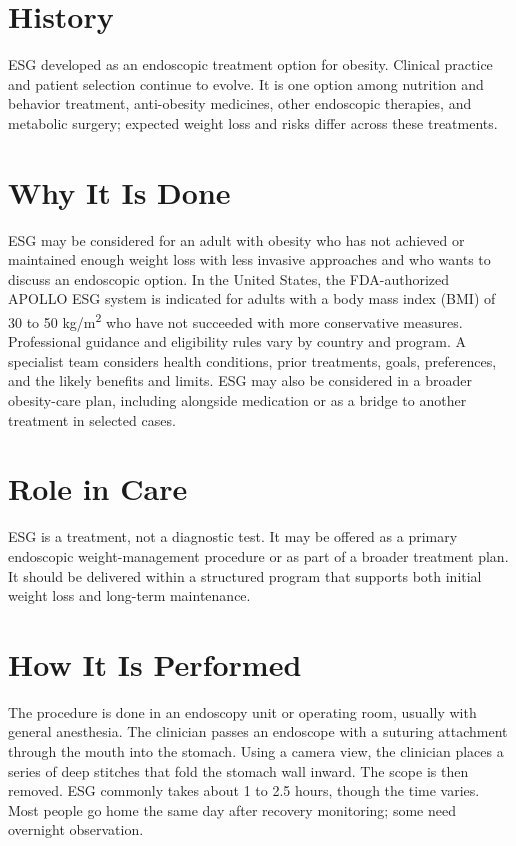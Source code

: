 \section*{History}
ESG developed as an endoscopic treatment option for obesity. Clinical practice and patient selection continue to evolve. It is one option among nutrition and behavior treatment, anti-obesity medicines, other endoscopic therapies, and metabolic surgery; expected weight loss and risks differ across these treatments.

\section*{Why It Is Done}
ESG may be considered for an adult with obesity who has not achieved or maintained enough weight loss with less invasive approaches and who wants to discuss an endoscopic option. In the United States, the FDA-authorized APOLLO ESG system is indicated for adults with a body mass index (BMI) of 30 to 50 kg/m\textsuperscript{2} who have not succeeded with more conservative measures. Professional guidance and eligibility rules vary by country and program. A specialist team considers health conditions, prior treatments, goals, preferences, and the likely benefits and limits. ESG may also be considered in a broader obesity-care plan, including alongside medication or as a bridge to another treatment in selected cases.

\section*{Role in Care}
ESG is a treatment, not a diagnostic test. It may be offered as a primary endoscopic weight-management procedure or as part of a broader treatment plan. It should be delivered within a structured program that supports both initial weight loss and long-term maintenance.

\section*{How It Is Performed}
The procedure is done in an endoscopy unit or operating room, usually with general anesthesia. The clinician passes an endoscope with a suturing attachment through the mouth into the stomach. Using a camera view, the clinician places a series of deep stitches that fold the stomach wall inward. The scope is then removed. ESG commonly takes about 1 to 2.5 hours, though the time varies. Most people go home the same day after recovery monitoring; some need overnight observation.

